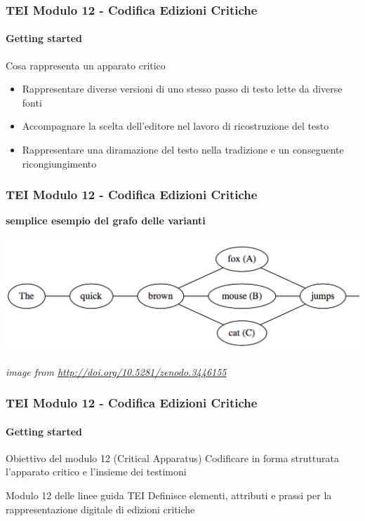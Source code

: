 \begin{frame}
    \frametitle{TEI Modulo 12 - Codifica Edizioni Critiche}
    \framesubtitle{Getting started}
    \addtocounter{nframe}{1}


    \begin{block}{Cosa rappresenta un apparato critico}
        \begin{itemize}
            \item Rappresentare diverse versioni di uno stesso passo di testo lette da diverse fonti
            \item Accompagnare la scelta dell'editore nel lavoro di ricostruzione del testo
            \item Rappresentare una diramazione del testo nella tradizione e un conseguente ricongiungimento
        \end{itemize}
    \end{block}
       
\end{frame}

\begin{frame}
    \frametitle{TEI Modulo 12 - Codifica Edizioni Critiche}
    \addtocounter{nframe}{1}
    
    \textbf{semplice esempio del grafo delle varianti}

    \begin{center}
        \includegraphics[width=.95\textwidth]{imgs/testo-divergente.png}
    \end{center}

    \textit{image from \url{http://doi.org/10.5281/zenodo.3446155}}

\end{frame}

\begin{frame}
    \frametitle{TEI Modulo 12 - Codifica Edizioni Critiche}
    \framesubtitle{Getting started}
    \addtocounter{nframe}{1}


    
    \begin{block}{Obiettivo del modulo 12 (Critical Apparatus)}
        Codificare in forma strutturata l'apparato critico e l'insieme dei testimoni
    \end{block}

    \begin{block}{Modulo 12 delle linee guida TEI}
        Definisce elementi, attributi e prassi per la rappresentazione digitale di edizioni critiche
    \end{block}

\end{frame}

